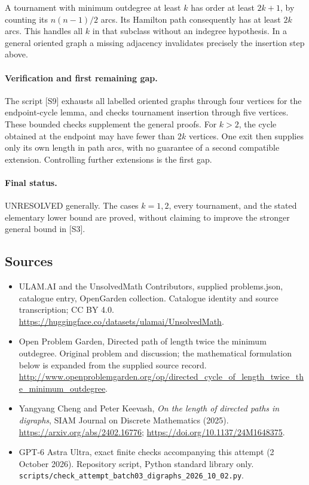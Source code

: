 \documentclass[11pt,a4paper]{article}
\begin{document}
A tournament with minimum outdegree at least $k$ has order at least
$2k+1$, by counting its $n(n-1)/2$ arcs. Its Hamilton path consequently
has at least $2k$ arcs. This handles all $k$ in that subclass without
an indegree hypothesis. In a general oriented graph a missing
adjacency invalidates precisely the insertion step above.

\paragraph{Verification and first remaining gap.}
The script [S9] exhausts all labelled oriented graphs through
four vertices for the endpoint-cycle lemma, and checks tournament
insertion through five vertices. These bounded checks supplement
the general proofs. For $k>2$, the cycle obtained at the endpoint
may have fewer than $2k$ vertices. One exit then supplies only its
own length in path arcs, with no guarantee of a second compatible
extension. Controlling further extensions is the first gap.

\paragraph{Final status.}
UNRESOLVED generally. The cases $k=1,2$, every tournament, and the
stated elementary lower bound are proved, without claiming to
improve the stronger general bound in [S3].
\subsection{Sources}
\begin{itemize}
\item[S1] ULAM.AI and the UnsolvedMath Contributors, supplied problems.json, catalogue entry, OpenGarden collection. Catalogue identity and source transcription; CC BY 4.0.
\url{https://huggingface.co/datasets/ulamai/UnsolvedMath}.
\item[S2] Open Problem Garden, Directed path of length twice the minimum outdegree. Original problem and discussion; the mathematical formulation below is expanded from the supplied source record.
\url{http://www.openproblemgarden.org/op/directed_cycle_of_length_twice_the_minimum_outdegree}.
\item[S3] Yangyang Cheng and Peter Keevash, \emph{On the length of directed paths in digraphs}, SIAM Journal on Discrete Mathematics (2025). \url{https://arxiv.org/abs/2402.16776}; \url{https://doi.org/10.1137/24M1648375}.
\item[S9] GPT-6 Astra Ultra, exact finite checks accompanying this attempt (2 October 2026). Repository script, Python standard library only. \texttt{scripts/check\_attempt\_batch03\_digraphs\_2026\_10\_02.py}.
\end{itemize}
\end{document}
